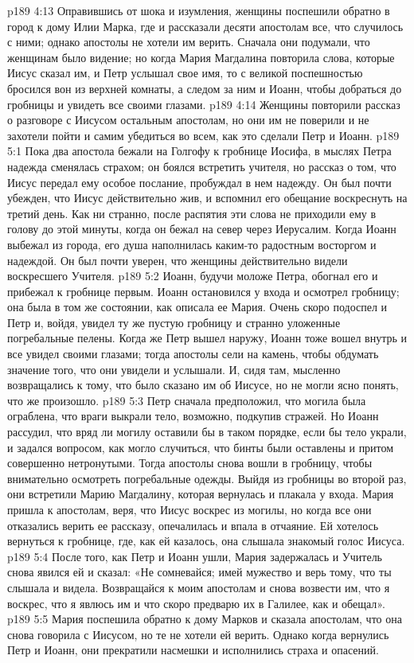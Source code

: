 \vs p189 4:13 Оправившись от шока и изумления, женщины поспешили обратно в город к дому Илии Марка, где и рассказали десяти апостолам все, что случилось с ними; однако апостолы не хотели им верить. Сначала они подумали, что женщинам было видение; но когда Мария Магдалина повторила слова, которые Иисус сказал им, и Петр услышал свое имя, то с великой поспешностью бросился вон из верхней комнаты, а следом за ним и Иоанн, чтобы добраться до гробницы и увидеть все своими глазами.
\vs p189 4:14 Женщины повторили рассказ о разговоре с Иисусом остальным апостолам, но они им не поверили и не захотели пойти и самим убедиться во всем, как это сделали Петр и Иоанн.
\vs p189 5:1 Пока два апостола бежали на Голгофу к гробнице Иосифа, в мыслях Петра надежда сменялась страхом; он боялся встретить учителя, но рассказ о том, что Иисус передал ему особое послание, пробуждал в нем надежду. Он был почти убежден, что Иисус действительно жив, и вспомнил его обещание воскреснуть на третий день. Как ни странно, после распятия эти слова не приходили ему в голову до этой минуты, когда он бежал на север через Иерусалим. Когда Иоанн выбежал из города, его душа наполнилась каким\hyp{}то радостным восторгом и надеждой. Он был почти уверен, что женщины действительно видели воскресшего Учителя.
\vs p189 5:2 Иоанн, будучи моложе Петра, обогнал его и прибежал к гробнице первым. Иоанн остановился у входа и осмотрел гробницу; она была в том же состоянии, как описала ее Мария. Очень скоро подоспел и Петр и, войдя, увидел ту же пустую гробницу и странно уложенные погребальные пелены. Когда же Петр вышел наружу, Иоанн тоже вошел внутрь и все увидел своими глазами; тогда апостолы сели на камень, чтобы обдумать значение того, что они увидели и услышали. И, сидя там, мысленно возвращались к тому, что было сказано им об Иисусе, но не могли ясно понять, что же произошло.
\vs p189 5:3 Петр сначала предположил, что могила была ограблена, что враги выкрали тело, возможно, подкупив стражей. Но Иоанн рассудил, что вряд ли могилу оставили бы в таком порядке, если бы тело украли, и задался вопросом, как могло случиться, что бинты были оставлены и притом совершенно нетронутыми. Тогда апостолы снова вошли в гробницу, чтобы внимательно осмотреть погребальные одежды. Выйдя из гробницы во второй раз, они встретили Марию Магдалину, которая вернулась и плакала у входа. Мария пришла к апостолам, веря, что Иисус воскрес из могилы, но когда все они отказались верить ее рассказу, опечалилась и впала в отчаяние. Ей хотелось вернуться к гробнице, где, как ей казалось, она слышала знакомый голос Иисуса.
\vs p189 5:4 После того, как Петр и Иоанн ушли, Мария задержалась и Учитель снова явился ей и сказал: «Не сомневайся; имей мужество и верь тому, что ты слышала и видела. Возвращайся к моим апостолам и снова возвести им, что я воскрес, что я явлюсь им и что скоро предварю их в Галилее, как и обещал».
\vs p189 5:5 Мария поспешила обратно к дому Марков и сказала апостолам, что она снова говорила с Иисусом, но те не хотели ей верить. Однако когда вернулись Петр и Иоанн, они прекратили насмешки и исполнились страха и опасений.
